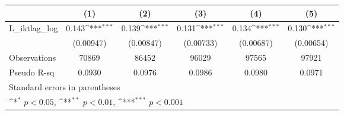 {
\def\sym#1{\ifmmode^{#1}\else\(^{#1}\)\fi}
\begin{tabular}{l*{5}{c}}
\hline\hline
                &\multicolumn{1}{c}{(1)}         &\multicolumn{1}{c}{(2)}         &\multicolumn{1}{c}{(3)}         &\multicolumn{1}{c}{(4)}         &\multicolumn{1}{c}{(5)}         \\
\hline
L\_iktlag\_log    &    0.143\sym{***}&    0.139\sym{***}&    0.131\sym{***}&    0.134\sym{***}&    0.130\sym{***}\\
                &(0.00947)         &(0.00847)         &(0.00733)         &(0.00687)         &(0.00654)         \\
\hline
Observations    &    70869         &    86452         &    96029         &    97565         &    97921         \\
Pseudo R-sq     &   0.0930         &   0.0976         &   0.0986         &   0.0980         &   0.0971         \\
\hline\hline
\multicolumn{6}{l}{\footnotesize Standard errors in parentheses}\\
\multicolumn{6}{l}{\footnotesize \sym{*} \(p<0.05\), \sym{**} \(p<0.01\), \sym{***} \(p<0.001\)}\\
\end{tabular}
}

